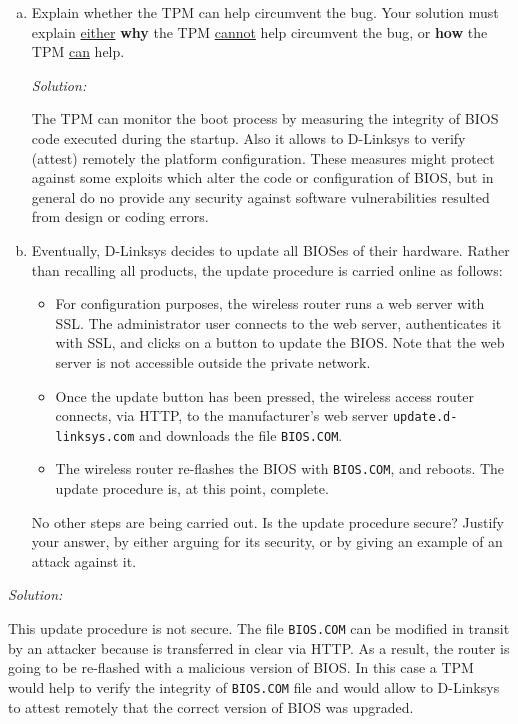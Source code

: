 \documentclass[a4paper,11pt]{article}
\newenvironment{solution}%
{\par{\noindent\small\textit{Solution:}}\vspace{-12pt}\begin{framed}}%
{\end{framed}\par}
\begin{document}
\begin{enumerate}[(a)]
\item Explain whether the TPM can help circumvent the bug. Your solution must explain
\underline{either} \textbf{why} the TPM \underline{cannot} help circumvent the
bug, or \textbf{how} the TPM \underline{can} help.

\ifsolution\begin{solution}
The TPM can monitor the boot process by measuring the integrity of BIOS code 
executed during the startup. Also it allows to D-Linksys to verify (attest) remotely 
the platform configuration. These measures might protect against some exploits
which alter the code or configuration of BIOS, but in general do no provide 
any security against software vulnerabilities resulted from design or coding errors.   
\end{solution}\fi

\item Eventually, D-Linksys decides to update all BIOSes of their hardware. Rather
than recalling all products, the update procedure is carried online as follows:

\begin{itemize}

\item For configuration purposes, the wireless router runs a web server with
SSL.  The administrator user connects to the web server, authenticates it with
SSL, and clicks on a button to update the BIOS. Note that the web server is not
accessible outside the private network.

\item Once the update button has been pressed, the wireless access router
connects, via HTTP, to the manufacturer's web server {\tt update.d-linksys.com}
and downloads the file {\tt BIOS.COM}.

\item The wireless router re-flashes the BIOS with  {\tt BIOS.COM}, and reboots.
The update procedure is, at this point, complete.

\end{itemize}

No other steps are being carried out. Is the update procedure secure? Justify
your answer, by either arguing for its security, or by giving an example of
an attack against it.

\end{enumerate}

\ifsolution\begin{solution}
This update procedure is not secure. The file {\tt BIOS.COM} can be modified 
in transit by an attacker because is transferred in clear via HTTP. As a result, 
the router is going to be re-flashed with a malicious version of BIOS. In this case 
a TPM would help to verify the integrity of {\tt BIOS.COM} file and would allow to 
D-Linksys to attest remotely that the correct version of BIOS was upgraded.      
\end{solution}\fi
\end{document}
